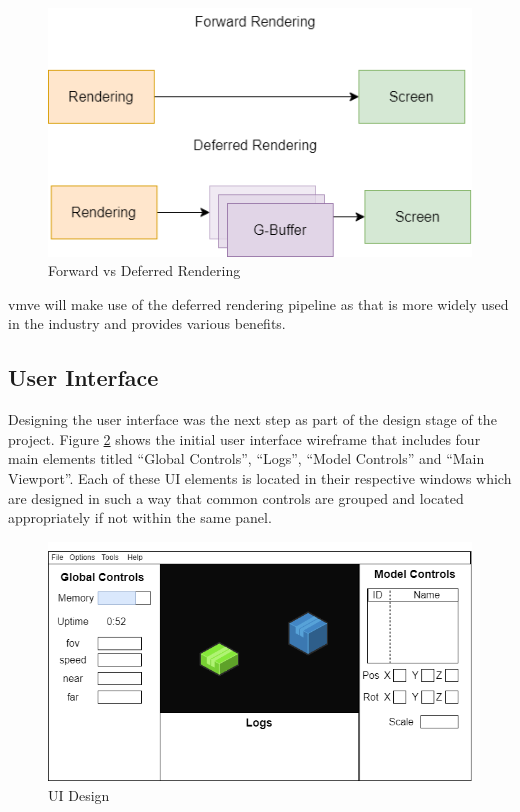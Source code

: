 \documentclass[11pt]{article}
\begin{document}
\begin{figure}[H]
  \centering
  \includegraphics[width=\textwidth]{images/forward_vs_deferred.png}
  \caption{Forward vs Deferred Rendering}
  \label{fig:forward_vs_deferred}
\end{figure}

\gls*{vmve} will make use of the deferred rendering pipeline as that is more
widely used in the industry and provides various benefits.


\subsection{User Interface}
Designing the user interface was the next step as part of the design stage of
the project. Figure \ref{fig:ui_design} shows the initial user interface
wireframe that includes four main elements titled ``Global Controls'', ``Logs'',
``Model Controls'' and ``Main Viewport''. Each of these UI elements is located
in their respective windows which are designed in such a way that common
controls are grouped and located appropriately if not within the same panel.

\begin{figure}[H]
  \centering
  \includegraphics[width=\textwidth]{images/ui_design.png}
  \caption{UI Design}
  \label{fig:ui_design}
\end{figure}
\end{document}
